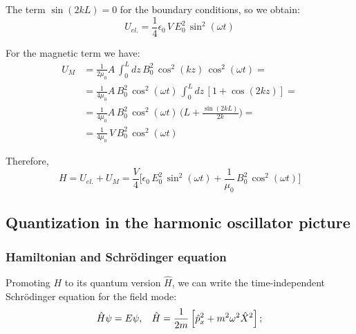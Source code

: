 The term $\sin(2kL)= 0$  for the boundary conditions, so we obtain:
\begin{equation}\label{eqn:11-single-mode-electric-energy-2}
U_{el.}=\frac{1}{4}\epsilon_0\, V\, E_0^2\, \sin^2(\omega t)
\end{equation}

For the magnetic term we have:
\begin{equation}\label{eqn:11-single-mode-magnetic-energy}
\begin{split}
    U_{M} &= \frac{1}{2\mu_0} A\, \int_0^L dz \, B_0^2\, \cos^2(kz)\, \cos^2(\omega t)= \\[1ex]
    &= \frac{1}{4\mu_0} A\, B_0^2\, \cos^2(\omega t) \, \int_0^L dz \, [1+\cos(2kz)]= \\[1ex]
    &=\frac{1}{4\mu_0} A\, B_0^2\, \cos^2(\omega t) \, \bigl(L+\frac{\sin(2kL)}{2k}\bigr) = \\[1ex]
    &= \frac{1}{4\mu_0}\, V\, B_0^2\, \cos^2(\omega t)
\end{split}
\end{equation}

Therefore,
  \[H = U_{el.}+U_M = \frac{V}{4}\biggr[\epsilon_0 \, E_0^2\, \sin^2(\omega t)+\frac{1}{\mu_0}\, B_0^2\, \cos^2(\omega t)\biggr]\]


\subsection{Quantization in the harmonic oscillator picture}\label{subsec:11-quantization-harmonic-oscillator}

\subsubsection{Hamiltonian and Schrödinger equation}

Promoting $H$ to its quantum version $\hat{H}$, we can write the time-independent Schrödinger equation for the field mode:
\begin{equation}\label{eqn:11-time-independent-schrodinger-equation}
\hat H\psi=E\psi,
\hspace{2ex}
\hat H=\frac{1}{2m}\left[\hat p_x^2+m^2\omega^2\hat X^2\right];
\end{equation}

